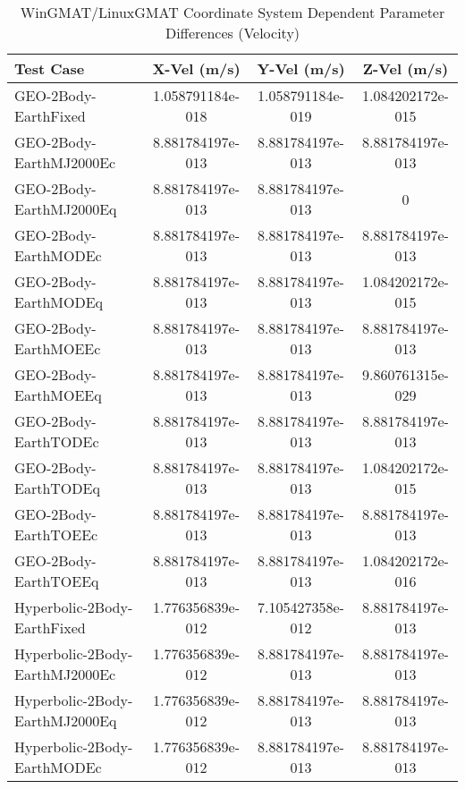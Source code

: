 \begin{table}[htbp!]
\centering
\caption{ WinGMAT/LinuxGMAT Coordinate System Dependent Parameter Differences (Velocity)}
      \begin{tabular}{lccc}
      \hline\hline
          Test Case & X-Vel (m/s) & Y-Vel (m/s) & Z-Vel (m/s) \\
         \hline
         GEO-2Body-EarthFixed & 1.058791184e-018 & 1.058791184e-019 & 1.084202172e-015 \\
         GEO-2Body-EarthMJ2000Ec & 8.881784197e-013 & 8.881784197e-013 & 8.881784197e-013 \\
         GEO-2Body-EarthMJ2000Eq & 8.881784197e-013 & 8.881784197e-013 & 0 \\
         GEO-2Body-EarthMODEc & 8.881784197e-013 & 8.881784197e-013 & 8.881784197e-013 \\
         GEO-2Body-EarthMODEq & 8.881784197e-013 & 8.881784197e-013 & 1.084202172e-015 \\
         GEO-2Body-EarthMOEEc & 8.881784197e-013 & 8.881784197e-013 & 8.881784197e-013 \\
         GEO-2Body-EarthMOEEq & 8.881784197e-013 & 8.881784197e-013 & 9.860761315e-029 \\
         GEO-2Body-EarthTODEc & 8.881784197e-013 & 8.881784197e-013 & 8.881784197e-013 \\
         GEO-2Body-EarthTODEq & 8.881784197e-013 & 8.881784197e-013 & 1.084202172e-015 \\
         GEO-2Body-EarthTOEEc & 8.881784197e-013 & 8.881784197e-013 & 8.881784197e-013 \\
         GEO-2Body-EarthTOEEq & 8.881784197e-013 & 8.881784197e-013 & 1.084202172e-016 \\
         Hyperbolic-2Body-EarthFixed & 1.776356839e-012 & 7.105427358e-012 & 8.881784197e-013 \\
         Hyperbolic-2Body-EarthMJ2000Ec & 1.776356839e-012 & 8.881784197e-013 & 8.881784197e-013 \\
         Hyperbolic-2Body-EarthMJ2000Eq & 1.776356839e-012 & 8.881784197e-013 & 8.881784197e-013 \\
         Hyperbolic-2Body-EarthMODEc & 1.776356839e-012 & 8.881784197e-013 & 8.881784197e-013 \\

\end{tabular}
\end{table}
